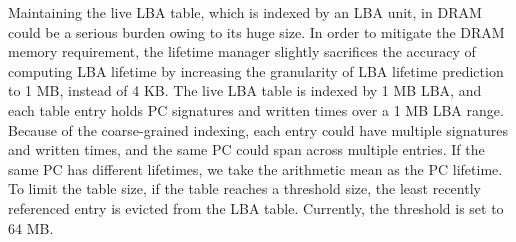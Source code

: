 Maintaining the live LBA table, which is indexed by an LBA unit, in DRAM could
be a serious burden owing to its huge size. In order to mitigate the DRAM
memory requirement, the lifetime manager slightly sacrifices the accuracy of
computing LBA lifetime by increasing the granularity of LBA lifetime prediction
to 1 MB, instead of 4 KB.  The live LBA table is indexed by 1 MB LBA, and each
table entry holds PC signatures and written times over a 1 MB LBA range.
Because of the coarse-grained indexing, each entry could have multiple
signatures and written times, and the same PC could span across multiple
entries.  If the same PC has different lifetimes, we take the arithmetic mean
as the PC lifetime.  To limit the table size, if the table reaches a threshold
size, the least recently referenced entry is evicted from the LBA table.
Currently, the threshold is set to 64 MB.

